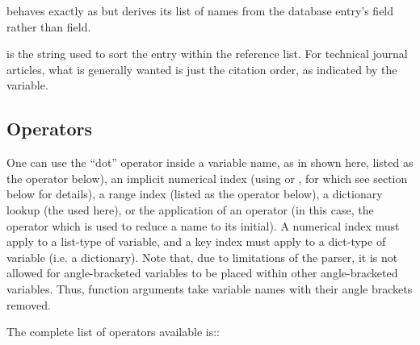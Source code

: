 \documentclass[letterpaper,10pt,english]{sphinxmanual}
\begin{document}
 behaves exactly as  but derives its list of names from the database entry’s  field rather than  field.

 is the string used to sort the entry within the reference list. For technical journal articles, what is generally wanted is just the citation order, as indicated by the  variable.


\subsection{Operators}
\label{\detokenize{guidelines_for_writing_style_templates:operators}}
One can use the “dot” operator inside a variable name, as in  shown here, listed as the  operator below), an implicit numerical index (using  or , for which see section  below for details), a range index (listed as the \sphinxcode{\sphinxupquote{\#\#:\#\#}} operator below), a dictionary lookup (the  used here), or the application of an operator (in this case, the  operator which is used to reduce a name to its initial). A numerical index must apply to a list-type of variable, and a key index must apply to a dict-type of variable (i.e. a dictionary). Note that, due to limitations of the parser, it is not allowed for  angle-bracketed variables to be placed within other angle-bracketed variables. Thus, function arguments take variable names with their angle brackets removed.

The complete list of operators available is::
\end{document}
